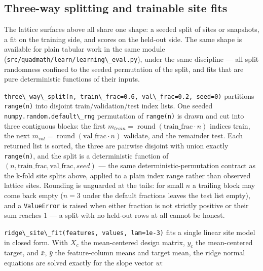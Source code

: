 \documentclass[
  10pt,
]{article}
\newcommand{\passthrough}[1]{#1}
\begin{document}
\subsection{Three-way splitting and trainable site
fits}\label{sec:learn_three_way_site_fits}

The lattice surfaces above all share one shape: a seeded split of sites
or snapshots, a fit on the training side, and scores on the held-out
side. The same shape is available for plain tabular work in the same
module (\passthrough{\lstinline!src/quadmath/learn/learning\_eval.py!}),
under the same discipline --- all split randomness confined to the
seeded permutation of the split, and fits that are pure deterministic
functions of their inputs.

\passthrough{\lstinline!three\_way\_split(n, train\_frac=0.6, val\_frac=0.2, seed=0)!}
partitions \passthrough{\lstinline!range(n)!} into disjoint
train/validation/test index lists. One seeded
\passthrough{\lstinline!numpy.random.default\_rng!} permutation of
\passthrough{\lstinline!range(n)!} is drawn and cut into three
contiguous blocks: the first \(m_{train} =
\operatorname{round}(\mathrm{train\_frac} \cdot n)\) indices train, the
next \(m_{val} = \operatorname{round}(\mathrm{val\_frac} \cdot n)\)
validate, and the remainder test. Each returned list is sorted, the
three are pairwise disjoint with union exactly
\passthrough{\lstinline!range(n)!}, and the split is a deterministic
function of \((n, \mathrm{train\_frac}, \mathrm{val\_frac}, seed)\) ---
the same deterministic-permutation contract as the k-fold site splits
above, applied to a plain index range rather than observed lattice
sites. Rounding is unguarded at the tails: for small \(n\) a trailing
block may come back empty (\(n = 3\) under the default fractions leaves
the test list empty), and a \passthrough{\lstinline!ValueError!} is
raised when either fraction is not strictly positive or their sum
reaches \(1\) --- a split with no held-out rows at all cannot be honest.

\passthrough{\lstinline!ridge\_site\_fit(features, values, lam=1e-3)!}
fits a single linear site model in closed form. With \(X_c\) the
mean-centered design matrix, \(y_c\) the mean-centered target, and
\(\bar{x}\), \(\bar{y}\) the feature-column means and target mean, the
ridge normal equations are solved exactly for the slope vector \(w\):
\end{document}
